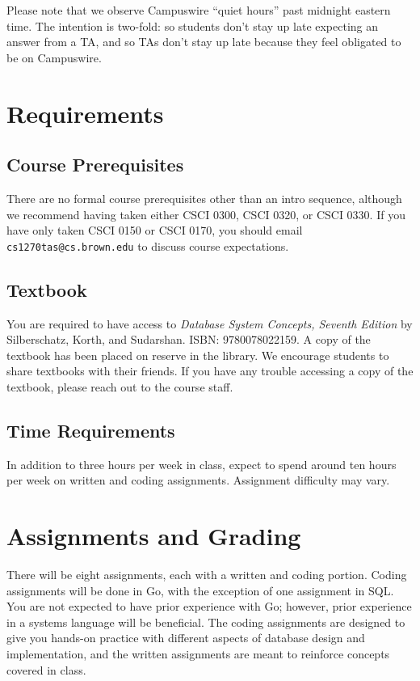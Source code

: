 \documentclass{article}
\begin{document}
Please note that we observe Campuswire ``quiet hours'' past midnight eastern time. The intention is two-fold: so students don't stay up late expecting an answer from a TA, and so TAs don't stay up late because they feel obligated to be on Campuswire.


\section{Requirements}
\subsection{Course Prerequisites}
There are no formal course prerequisites other than an intro sequence, although we recommend having taken either CSCI 0300, CSCI 0320, or CSCI 0330. If you have only taken CSCI 0150 or CSCI 0170, you should email \texttt{cs1270tas@cs.brown.edu} to discuss course expectations.

\subsection{Textbook}
You are required to have access to \emph{Database System Concepts, Seventh Edition} by Silberschatz, Korth, and Sudarshan. ISBN: 9780078022159. A copy of the textbook has been placed on reserve in the library. We encourage students to share textbooks with their friends. If you have any trouble accessing a copy of the textbook, please reach out to the course staff.

\subsection{Time Requirements}
In addition to three hours per week in class, expect to spend around ten hours per week on written and coding assignments. Assignment difficulty may vary.


\newpage
\section{Assignments and Grading}
There will be eight assignments, each with a written and coding portion. Coding assignments will be done in Go, with the exception of one assignment in SQL. You are not expected to have prior experience with Go; however, prior experience in a systems language will be beneficial. The coding assignments are designed to give you hands-on practice with different aspects of database design and implementation, and the written assignments are meant to reinforce concepts covered in class.
\end{document}
